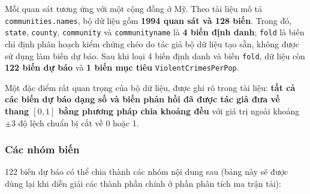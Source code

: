 Mỗi quan sát tương ứng với một cộng đồng ở Mỹ. Theo tài liệu mô tả
\texttt{communities.names}, bộ dữ liệu gồm \textbf{1994 quan sát và 128
biến}. Trong đó, \texttt{state}, \texttt{county}, \texttt{community} và
\texttt{communityname} là \textbf{4 biến định danh}; \texttt{fold} là
biến chỉ định phân hoạch kiểm chứng chéo do tác giả bộ dữ liệu tạo sẵn,
không được sử dụng làm biến dự báo. Sau khi loại 4 biến định danh và
biến \texttt{fold}, dữ liệu còn \textbf{122 biến dự báo} và \textbf{1
biến mục tiêu} \texttt{ViolentCrimesPerPop}.

Một đặc điểm rất quan trọng của bộ dữ liệu, được ghi rõ trong tài liệu:
\textbf{tất cả các biến dự báo dạng số và biến phản hồi đã được tác giả
đưa về thang \([0, 1]\) bằng phương pháp chia khoảng đều} với giá trị
ngoài khoảng \(\pm 3\) độ lệch chuẩn bị cắt về 0 hoặc 1.

\subsubsection{Các nhóm biến}\label{cuxe1c-nhuxf3m-biux1ebfn}

122 biến dự báo có thể chia thành các nhóm nội dung sau (bảng này sẽ
được dùng lại khi diễn giải các thành phần chính ở phần phân tích ma
trận tải):

